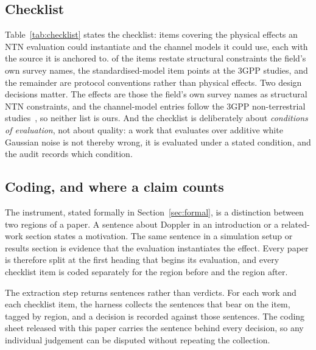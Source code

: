 \documentclass[preprint,11pt,3p]{elsarticle}
\begin{document}
\subsection{Checklist}

Table~\ref{tab:checklist} states the checklist: \numChecklist{} items covering the physical
effects an NTN evaluation could instantiate and the channel models it could use, each with the
source it is anchored to. \numFromSurvey{} of the items restate structural constraints the
field's own survey names, the standardised-model item points at the 3GPP studies, and the
remainder are protocol conventions rather than physical effects. Two design decisions matter. The effects are
those the field's own survey names as structural NTN constraints, and the channel-model entries
follow the 3GPP non-terrestrial studies~\cite{tr38811,tr38821}, so neither list is ours. And the checklist is deliberately
about \emph{conditions of evaluation}, not about quality: a work that evaluates over additive
white Gaussian noise is not thereby wrong, it is evaluated under a stated condition, and the
audit records which condition.

\begin{table}[t]
\centering
\caption{The checklist, with the source each item is anchored to. ``Survey'' items restate
structural constraints named by the field's own survey, ``3GPP'' points at the non-terrestrial
channel studies, ``Orbit'' follows from orbital mechanics, and ``Protocol'' items are evaluation
conventions rather than physical effects.}
\label{tab:checklist}

\end{table}


\subsection{Coding, and where a claim counts}

The instrument, stated formally in Section~\ref{sec:formal}, is a distinction between two
regions of a paper. A sentence about Doppler in an
introduction or a related-work section states a motivation. The same sentence in a simulation
setup or results section is evidence that the evaluation instantiates the effect. Every paper is
therefore split at the first heading that begins its evaluation, and every checklist item is
coded separately for the region before and the region after.

The extraction step returns sentences rather than verdicts. For each work and each checklist
item, the harness collects the sentences that bear on the item, tagged by region, and a decision
is recorded against those sentences. The coding sheet released with this paper carries the
sentence behind every decision, so any individual judgement can be disputed without repeating
the collection.
\end{document}
